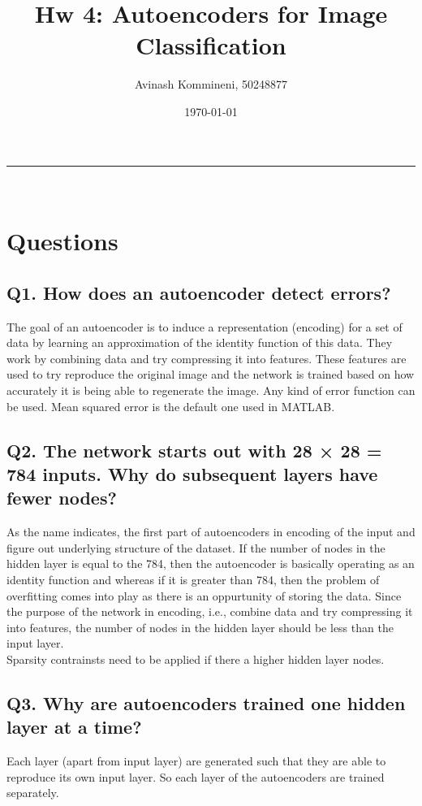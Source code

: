 \documentclass[a4paper,11pt]{article}
\makeatletter
\newcommand{\linia}{\rule{\linewidth}{0.5pt}}
\renewcommand{\maketitle}{
\begin{center}
\vspace{1ex}
{\LARGE \textsc{\@title}}
\vspace{0.5ex}
\linia\\
\@author \hfill \@date
\vspace{3ex}
\end{center}
}
\makeatother
\begin{document}
\title{Hw 4: Autoencoders for Image Classification}

\author{Avinash Kommineni, 50248877} 
\date{\today}

\maketitle

\section*{Questions}

\subsection*{Q1. How does an autoencoder detect errors?}
The goal of an autoencoder is to induce a representation (encoding) for a set of data by learning an approximation of the identity function of this data. They work by combining data and try compressing it into features. These features are used to try reproduce the original image and the network is trained based on how accurately it is being able to regenerate the image. Any kind of error function can be used. Mean squared error is the default one used in MATLAB.

\subsection*{Q2. The network starts out with 28 × 28 = 784 inputs. Why do subsequent layers have fewer nodes?}
As the name indicates, the first part of autoencoders in encoding of the input and figure out underlying structure of the dataset. If the number of nodes in the hidden layer is equal to the 784, then the autoencoder is basically operating as an identity function and whereas if it is greater than 784, then the problem of overfitting comes into play as there is an oppurtunity of storing the data. Since the purpose of the network in encoding, i.e., combine data and try compressing it into features, the number of nodes in the hidden layer should be less than the input layer.\\
Sparsity contrainsts need to be applied if there a higher hidden layer nodes.

\subsection*{Q3. Why are autoencoders trained one hidden layer at a time?}
Each layer (apart from input layer) are generated such that they are able to reproduce its own input layer. So each layer of the autoencoders are trained separately.
\end{document}
